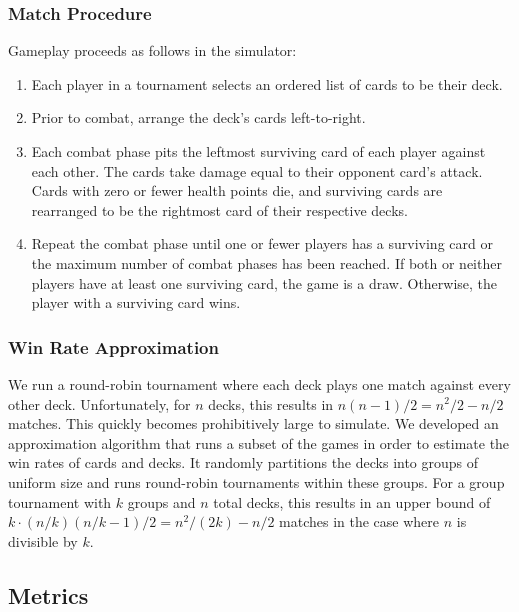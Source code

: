 \documentclass[letterpaper]{article} %
\begin{document}
\subsubsection{Match Procedure} \label{sec:game}

Gameplay proceeds as follows in the simulator:

\begin{enumerate}
	\item Each player in a tournament selects an ordered list
	of cards to be their deck.
	\item Prior to combat, arrange the deck's cards left-to-right.
	\item Each combat phase pits the leftmost surviving card
	of each player against each other. The cards take damage equal to %
        their opponent card's attack.
	Cards with zero or fewer health points die, and surviving cards
	are rearranged to be the rightmost card of their respective decks.
	\item Repeat the combat phase until one or fewer players has a surviving card
	or the maximum number of combat phases has been reached.
	If both or neither players have at least one surviving card, the game is a draw.
	Otherwise, the player with a surviving card wins.
\end{enumerate}

\subsubsection{Win Rate Approximation} \label{sec:tourney}

We run a round-robin tournament where each deck plays one match against every other deck.
Unfortunately, for $n$ decks, this results in $n(n-1)/2 = n^2/2 - n/2$ matches. This quickly becomes prohibitively large to simulate. We developed an approximation algorithm that runs a subset of the games in order to estimate the win rates of cards and decks. It
randomly partitions the decks into groups of uniform size and runs round-robin tournaments within these groups.
For a group tournament with $k$ groups and $n$ total decks, this results in an upper bound of $k \cdot (n/k)(n/k - 1)/2 = n^2/(2k) - n/2$ matches in the case where 
$n$ is divisible by $k$.

\subsection{Metrics} \label{sec:metrics}
\end{document}
